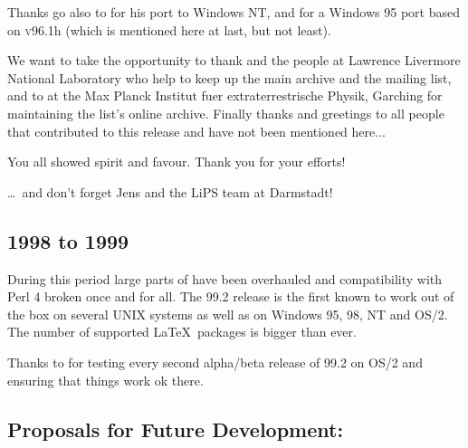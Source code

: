 \smallskip\noindent
Thanks go also to \Popineau{} for his port to Windows NT,
and \NikosDrakos{} for a Windows 95 port based on \textsc{v96.1}h
(which is mentioned here at last, but not least).

\medskip\noindent
We want to take the opportunity to thank \Nelson{} and the people at
Lawrence Livermore National Laboratory who help to keep up the
\latextohtml{} main archive and the mailing list, and to \Bohnet{} at
the Max Planck Institut fuer extraterrestrische Physik, Garching for
maintaining the list's online archive.
Finally thanks and greetings to all people that contributed to this
release and have not been mentioned here...

\medskip\noindent
You all showed spirit and favour. Thank you for your efforts!

\medskip
\begin{flushright}
\dots\ and don't forget Jens and the LiPS team at Darmstadt!
\end{flushright}

\subsection*{1998 to 1999}\label{recent99}%
During this period large parts of \latextohtml{} have been overhauled and
compatibility with Perl 4 broken once and for all. The 99.2 release is the
first known to work out of the box on several UNIX systems as well as on 
Windows 95, 98, NT and OS/2. The number of supported \LaTeX\ packages is
bigger than ever.

\medskip\noindent
Thanks to \Perbandt{} for testing every second alpha/beta release of
99.2 on OS/2 and ensuring that things work ok there.


\subsection*{Proposals for Future Development:\label{future}}%



